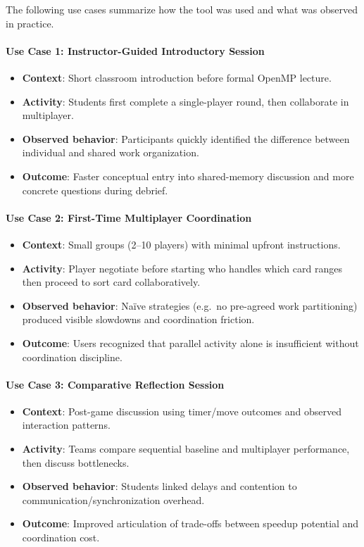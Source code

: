 The following use cases summarize how the tool was used and what was observed in practice.

\paragraph*{Use Case 1: Instructor-Guided Introductory Session}
\begin{itemize}
    \item \textbf{Context}: Short classroom introduction before formal OpenMP lecture.
    \item \textbf{Activity}: Students first complete a single-player round, then collaborate in multiplayer.
    \item \textbf{Observed behavior}: Participants quickly identified the difference between individual and shared work organization.
    \item \textbf{Outcome}: Faster conceptual entry into shared-memory discussion and more concrete questions during debrief.
\end{itemize}

\paragraph*{Use Case 2: First-Time Multiplayer Coordination}
\begin{itemize}
    \item \textbf{Context}: Small groups (2--10 players) with minimal upfront instructions.
    \item \textbf{Activity}: Player negotiate before starting who handles which card ranges then proceed to sort card collaboratively.
    \item \textbf{Observed behavior}: Na\"{i}ve strategies (e.g.\ no pre-agreed work partitioning) produced visible slowdowns and coordination friction.
    \item \textbf{Outcome}: Users recognized that parallel activity alone is insufficient without coordination discipline.
\end{itemize}

\paragraph*{Use Case 3: Comparative Reflection Session}
\begin{itemize}
    \item \textbf{Context}: Post-game discussion using timer/move outcomes and observed interaction patterns.
    \item \textbf{Activity}: Teams compare sequential baseline and multiplayer performance, then discuss bottlenecks.
    \item \textbf{Observed behavior}: Students linked delays and contention to communication/synchronization overhead.
    \item \textbf{Outcome}: Improved articulation of trade-offs between speedup potential and coordination cost.
\end{itemize}

